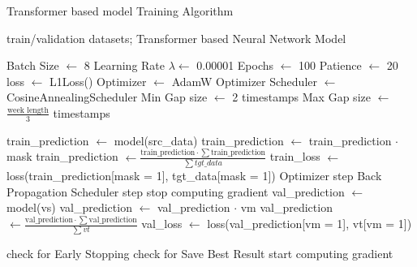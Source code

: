 \begin{algorithm}[H]
	\caption{Transformer based model Training Algorithm}\label{alg:gabtraining}
	\begin{algorithmic}
		\Require train/validation datasets; Transformer based Neural Network Model

		\State Batch Size $\gets$ 8
		\State Learning Rate $\lambda \gets$ 0.00001
		\State Epochs $\gets$ 100
		\State Patience $\gets$ 20
		\State loss $\gets$ L1Loss()
		\State Optimizer $\gets$ AdamW Optimizer
		\State Scheduler $\gets$ CosineAnnealingScheduler
		\State Min Gap size $\gets$ 2 timestamps
		\State Max Gap size $\gets$ $\frac{\text{week length}}{3}$ timestamps
		\State

		\State train\_prediction $\gets$ model(src\_data) 
		\State train\_prediction $\gets$ train\_prediction $\cdot$ mask
		\State train\_prediction $\gets \frac{\text{train\_prediction} \cdot \sum\text{train\_prediction}}{\sum tgt\_data}$ 
		\State train\_loss $\gets$ loss(train\_prediction[mask = 1], tgt\_data[mask = 1])
		\State Optimizer step
		\State Back Propagation
		\EndFor
		\State Scheduler step
		\State stop computing gradient
		\State val\_prediction $\gets$ model(vs) 
		\State val\_prediction $\gets$ val\_prediction $\cdot$ vm
		\State val\_prediction $\gets \frac{\text{val\_prediction} \cdot \sum\text{val\_prediction}}{\sum vt}$ 
		\State val\_loss $\gets$ loss(val\_prediction[vm = 1], vt[vm = 1])
		\EndFor

		\State check for Early Stopping
		\State check for Save Best Result
		\State start computing gradient
		\EndFor
	\end{algorithmic}
\end{algorithm}

